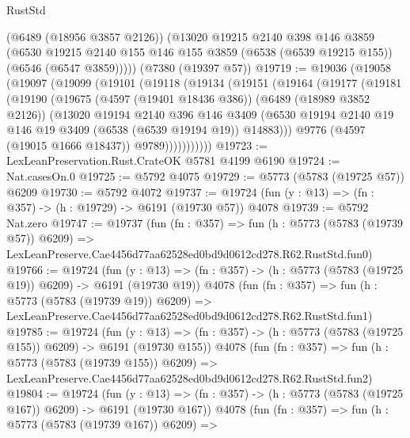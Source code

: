 \begin{lexlean}{RustStd}
\begin{coremodule}
      (@6489 (@18956 @3857 @2126))
      (@13020
        @19215
        @2140
        @398
        @146
        @3859
        (@6530
          @19215
          @2140
          @155
          @146
          @155
          @3859
          (@6538 (@6539 @19215 @155))
          (@6546 (@6547 @3859)))))
    (@7380 (@19397 @57))
@19719 := @19036
    (@19058
      (@19097
        (@19099
          (@19101
            (@19118
              (@19134
                (@19151
                  (@19164
                    (@19177
                      (@19181
                        (@19190
                          (@19675
                            (@4597 (@19401 @18436 @386))
                            (@6489 (@18989 @3852 @2126))
                            (@13020
                              @19194
                              @2140
                              @396
                              @146
                              @3409
                              (@6530
                                @19194
                                @2140
                                @19
                                @146
                                @19
                                @3409
                                (@6538 (@6539 @19194 @19))
                                @14883)))
                          @9776
                          (@4597 (@19015 @1666 @18437))
                          @9789)))))))))))
@19723 := LexLeanPreservation.Rust.CrateOK @5781 @4199 @6190
@19724 := Nat.casesOn.{0}
@19725 := @5792 @4075
@19729 := @5773 (@5783 (@19725 @57)) @6209
@19730 := @5792 @4072
@19737 := @19724 (fun (y : @13) => (fn : @357) -> (h : @19729) -> @6191 (@19730 @57)) @4078
@19739 := @5792 Nat.zero
@19747 := @19737
    (fun (fn : @357) =>
    fun (h : @5773 (@5783 (@19739 @57)) @6209) =>
    LexLeanPreserve.Cae4456d77aa62528ed0bd9d0612cd278.R62.RustStd.fun0)
@19766 := @19724
    (fun (y : @13) => (fn : @357) -> (h : @5773 (@5783 (@19725 @19)) @6209) -> @6191 (@19730 @19))
    @4078
    (fun (fn : @357) =>
    fun (h : @5773 (@5783 (@19739 @19)) @6209) =>
    LexLeanPreserve.Cae4456d77aa62528ed0bd9d0612cd278.R62.RustStd.fun1)
@19785 := @19724
    (fun (y : @13) => (fn : @357) -> (h : @5773 (@5783 (@19725 @155)) @6209) -> @6191 (@19730 @155))
    @4078
    (fun (fn : @357) =>
    fun (h : @5773 (@5783 (@19739 @155)) @6209) =>
    LexLeanPreserve.Cae4456d77aa62528ed0bd9d0612cd278.R62.RustStd.fun2)
@19804 := @19724
    (fun (y : @13) => (fn : @357) -> (h : @5773 (@5783 (@19725 @167)) @6209) -> @6191 (@19730 @167))
    @4078
    (fun (fn : @357) =>
    fun (h : @5773 (@5783 (@19739 @167)) @6209) =>

\end{coremodule}
\end{lexlean}
